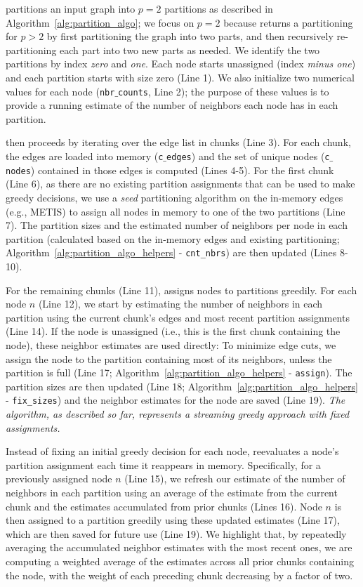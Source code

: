 \partitioning partitions an input graph into $p=2$ partitions as described in Algorithm~\ref{alg:partition_algo}; we focus on $p=2$ because \partitioning returns a partitioning for $p>2$ by first partitioning the graph into two parts, and then recursively re-partitioning each part into two new parts as needed. We identify the two partitions by index \textit{zero} and \textit{one}. Each node starts unassigned (index \textit{minus one}) and each partition starts with size zero (Line 1). We also initialize two numerical values for each node (\texttt{nbr$\_$counts}, Line 2); the purpose of these values is to provide a running estimate of the number of neighbors each node has in each partition. 

\partitioning then proceeds by iterating over the edge list in chunks (Line 3). For each chunk, the edges are loaded into memory (\texttt{c$\_$edges}) and the set of unique nodes (\texttt{c$\_$nodes}) contained in those edges is computed (Lines 4-5). For the first chunk (Line 6), as there are no existing partition assignments that can be used to make greedy decisions, we use a \textit{seed} partitioning algorithm on the in-memory edges (e.g., METIS) to assign all nodes in memory to one of the two partitions (Line 7). The partition sizes and the estimated number of neighbors per node in each partition (calculated based on the in-memory edges and existing partitioning; Algorithm~\ref{alg:partition_algo_helpers} - \texttt{cnt\_nbrs}) are then updated (Lines 8-10). 

For the remaining chunks (Line 11), \partitioning assigns nodes to partitions greedily. For each node $n$ (Line 12), we start by estimating the number of neighbors in each partition using the current chunk's edges and most recent partition assignments (Line 14). If the node is unassigned (i.e., this is the first chunk containing the node), these neighbor estimates are used directly: To minimize edge cuts, we assign the node to the partition containing most of its neighbors, unless the partition is full (Line 17; Algorithm~\ref{alg:partition_algo_helpers} - \texttt{assign}). The partition sizes are then updated (Line 18; Algorithm~\ref{alg:partition_algo_helpers} - \texttt{fix\_sizes}) and the neighbor estimates for the node are saved (Line 19). \textit{The algorithm, as described so far, represents a streaming greedy approach with fixed assignments.} 

Instead of fixing an initial greedy decision for each node, \partitioning reevaluates a node's partition assignment each time it reappears in memory. Specifically, for a previously assigned node $n$ (Line 15), we refresh our estimate of the number of neighbors in each partition using an average of the estimate from the current chunk and the estimates accumulated from prior chunks (Lines 16). Node $n$ is then assigned to a partition greedily using these updated estimates (Line 17), which are then saved for future use (Line 19). We highlight that, by repeatedly averaging the accumulated neighbor estimates with the most recent ones, we are computing a weighted average of the estimates across all prior chunks containing the node, with the weight of each preceding chunk decreasing by a factor of two.

